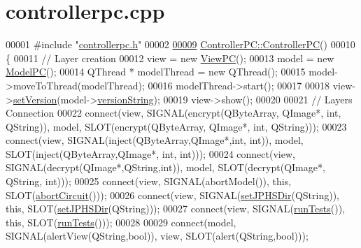 \hypertarget{controllerpc_8cpp_source}{\section{controllerpc.\-cpp}
}

\begin{DoxyCode}
00001 \textcolor{preprocessor}{#include "\hyperlink{controllerpc_8h}{controllerpc.h}"}
00002 
\hypertarget{controllerpc_8cpp_source_l00009}{}\hyperlink{class_controller_p_c_afa6c92d67bf3b6531c42385fc5938003}{00009} \hyperlink{class_controller_p_c_afa6c92d67bf3b6531c42385fc5938003}{ControllerPC::ControllerPC}()
00010 \{
00011     \textcolor{comment}{// Layer creation}
00012     view = \textcolor{keyword}{new} \hyperlink{class_view_p_c}{ViewPC}();
00013     model = \textcolor{keyword}{new} \hyperlink{class_model_p_c}{ModelPC}();
00014     QThread * modelThread = \textcolor{keyword}{new} QThread();
00015     model->moveToThread(modelThread);
00016     modelThread->start();
00017 
00018     view->\hyperlink{class_view_p_c_ac05220df875b7c4f24405a5742476ebf}{setVersion}(model->\hyperlink{class_model_p_c_a5f426725ccf7eefd3c77ea8c720264c9}{versionString});
00019     view->show();
00020 
00021     \textcolor{comment}{// Layers Connection}
00022     connect(view, SIGNAL(encrypt(QByteArray, QImage*, \textcolor{keywordtype}{int}, QString)), model, SLOT(encrypt(QByteArray, 
      QImage*, \textcolor{keywordtype}{int}, QString)));
00023     connect(view, SIGNAL(inject(QByteArray,QImage*,\textcolor{keywordtype}{int}, \textcolor{keywordtype}{int})), model, SLOT(inject(QByteArray,QImage*, \textcolor{keywordtype}{int}, \textcolor{keywordtype}{
      int})));
00024     connect(view, SIGNAL(decrypt(QImage*,QString,\textcolor{keywordtype}{int})), model, SLOT(decrypt(QImage*, QString, \textcolor{keywordtype}{int})));
00025     connect(view, SIGNAL(abortModel()), \textcolor{keyword}{this}, SLOT(\hyperlink{class_controller_p_c_a8814989f7be1214e06b2e720889066b0}{abortCircuit}()));
00026     connect(view, SIGNAL(\hyperlink{class_controller_p_c_ac00d29685a7e5b780c01eb438e10f96d}{setJPHSDir}(QString)), \textcolor{keyword}{this}, SLOT(\hyperlink{class_controller_p_c_ac00d29685a7e5b780c01eb438e10f96d}{setJPHSDir}(QString)));
00027     connect(view, SIGNAL(\hyperlink{class_controller_p_c_aaa59fc90e1ef731eee4560ec87e43707}{runTests}()), \textcolor{keyword}{this}, SLOT(\hyperlink{class_controller_p_c_aaa59fc90e1ef731eee4560ec87e43707}{runTests}()));
00028 
00029     connect(model, SIGNAL(alertView(QString,\textcolor{keywordtype}{bool})), view, SLOT(alert(QString,\textcolor{keywordtype}{bool})));

\end{DoxyCode}
